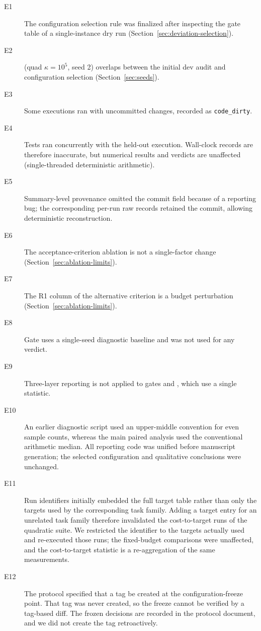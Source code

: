 \begin{description}
  \item[E1] The configuration selection rule was finalized after inspecting the gate
    table of a single-instance dry run (Section~\ref{sec:deviation-selection}).
  \item[E2] (quad $\kappa{=}10^5$, seed 2) overlaps between the initial dev audit and
    configuration selection (Section~\ref{sec:seeds}).
  \item[E3] Some executions ran with uncommitted changes, recorded as
    \texttt{code\_dirty}.
  \item[E4] Tests ran concurrently with the held-out execution. Wall-clock records are
    therefore inaccurate, but numerical results and verdicts are unaffected
    (single-threaded deterministic arithmetic).
  \item[E5] Summary-level provenance omitted the commit field because of a reporting
    bug; the corresponding per-run raw records retained the commit, allowing
    deterministic reconstruction.
  \item[E6] The acceptance-criterion ablation is not a single-factor change
    (Section~\ref{sec:ablation-limits}).
  \item[E7] The R1 column of the alternative criterion is a budget perturbation
    (Section~\ref{sec:ablation-limits}).
  \item[E8] Gate  uses a single-seed diagnostic baseline and was not used for
    any verdict.
  \item[E9] Three-layer reporting is not applied to gates  and ,
    which use a single statistic.
  \item[E10] An earlier diagnostic script used an upper-middle convention for even
    sample counts, whereas the main paired analysis used the conventional arithmetic
    median. All reporting code was unified before manuscript generation; the selected
    configuration and qualitative conclusions were unchanged.
  \item[E11] Run identifiers initially embedded the full target table rather than only
    the targets used by the corresponding task family. Adding a target entry for an
    unrelated task family therefore invalidated the cost-to-target runs of the
    quadratic suite. We restricted the identifier to the targets actually used and
    re-executed those runs; the fixed-budget comparisons were unaffected, and the
    cost-to-target statistic is a re-aggregation of the same measurements.
  \item[E12] The protocol specified that a tag be created at the
    configuration-freeze point. That tag was never created, so the freeze cannot be
    verified by a tag-based diff. The frozen decisions are recorded in the protocol
    document, and we did not create the tag retroactively.
\end{description}

